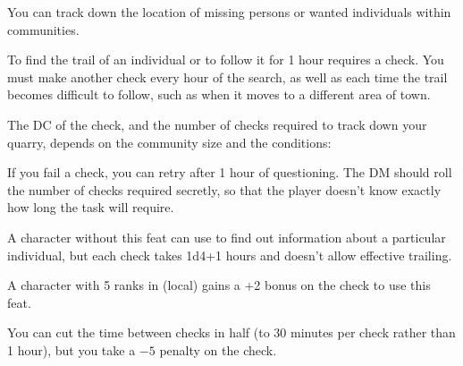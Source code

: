 {You can track down the location of missing persons or wanted individuals within communities.}{}
{
To find the trail of an individual or to follow it for 1 hour requires a  check. You must make another  check every hour of the search, as well as each time the trail becomes difficult to follow, such as when it moves to a different area of town.


The DC of the check, and the number of checks required to track down your quarry, depends on the community size and the conditions:

If you fail a  check, you can retry after 1 hour of questioning. The DM should roll the number of checks required secretly, so that the player doesn't know exactly how long the task will require.

}
{A character without this feat can use  to find out information about a particular individual, but each check takes 1d4+1 hours and doesn't allow effective trailing.}
{A character with 5 ranks in  (local) gains a +2 bonus on the  check to use this feat.

You can cut the time between  checks in half (to 30 minutes per check rather than 1 hour), but you take a $-5$ penalty on the check.}

